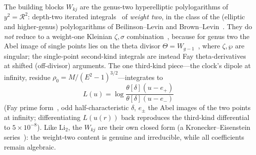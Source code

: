 \documentclass[12pt]{iopart}
\begin{document}
The building blocks $W_{kj}$ are the genus-two hyperelliptic polylogarithms of
$y^2=\mathcal{R}^2$: depth-two iterated integrals~\cite{Chen1977} of \emph{weight
two}, in the class of the (elliptic and higher-genus) polylogarithms of
Beilinson--Levin and Brown--Levin~\cite{BeilinsonLevin1994,BrownLevin2011}. They do
\emph{not} reduce to a weight-one Kleinian $\zeta,\sigma$
combination~\cite{BakerAbelian1897,BuchstaberEnolskii1997}, because for
genus two the Abel image of single points lies on the theta divisor
$\Theta=W_{g-1}$~\cite{MumfordTata}, where $\zeta,\wp$ are singular; the single-point
second-kind integrals are instead Fay theta-derivatives at shifted (off-divisor)
arguments. The one third-kind piece---the clock's dipole at infinity, residue
$\rho_0=M/(E^2-1)^{3/2}$---integrates to
\begin{equation}
    L(u)=\log\frac{\theta[\delta](u-e_+)}{\theta[\delta](u-e_-)}
    \label{eq:thirdkind-theta}
\end{equation}
(Fay prime form~\cite{Fay1973}, odd half-characteristic $\delta$, $e_\pm$ the Abel
images of the two points at infinity; differentiating $L(u(r))$ back reproduces the
third-kind differential to $5\times10^{-8}$). Like $\mathrm{Li}_2$, the $W_{kj}$ are
their own closed form (a Kronecker--Eisenstein series~\cite{BeilinsonLevin1994}): the
weight-two content is genuine and irreducible, while all coefficients remain
algebraic.
\end{document}
